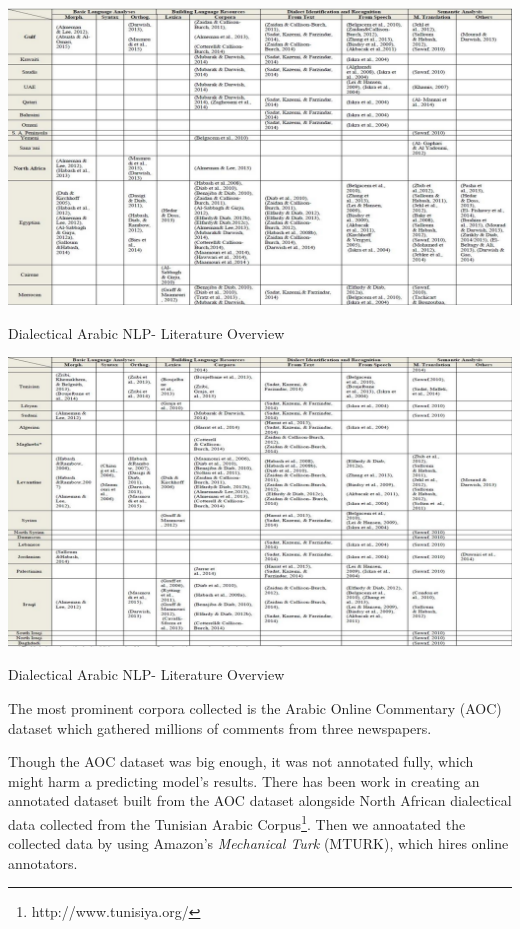 \documentclass[12pt]{diazessay}
\begin{document}
    \clearpage
    \begin{table}[h]
        \hskip-3cm
        \includegraphics[scale=0.45]{Figures/past_word_1.png}
        \caption{Dialectical Arabic NLP- Literature Overview\cite{shoufan_alameri_2015_natural}}
        \label{fig:cmp}
    \end{table}
    
    \clearpage
    \begin{table}[h]
        \hskip-3cm
        \includegraphics[scale=0.45]{Figures/past_work_2.png}
        \caption{Dialectical Arabic NLP- Literature Overview\cite{shoufan_alameri_2015_natural}}
        \label{fig:cmp}
    \end{table}
    \clearpage
    
    
    The most prominent corpora collected is the Arabic Online Commentary (AOC) dataset which gathered millions of comments from three newspapers\cite{zaidan_burch}\label{txt:aoc}.
    
    Though the AOC dataset was big enough, it was not annotated fully, which might harm a predicting model's results. There has been work in creating an annotated dataset built from the AOC dataset alongside North African dialectical data collected from the Tunisian Arabic Corpus\footnote{http://www.tunisiya.org/}. Then we annoatated the collected data by using Amazon's \emph{Mechanical Turk} (MTURK), which hires online annotators\cite{el_haj_etal_2018_arabic}.
     
\end{document}
